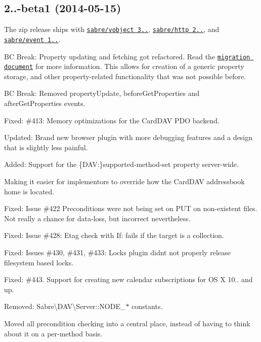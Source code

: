 \subsection*{2..-\/beta1 (2014-\/05-\/15) }


\begin{DoxyItemize}
\item The zip release ships with \href{http://sabre.io/vobject/}{\tt sabre/vobject 3..}, \href{http://sabre.io/http/}{\tt sabre/http 2..}, and \href{http://sabre.io/event/}{\tt sabre/event 1..}.
\item BC Break\+: Property updating and fetching got refactored. Read the \href{http://sabre.io/dav/upgrade/1.8-to-2.0/}{\tt migration document} for more information. This allows for creation of a generic property storage, and other property-\/related functionality that was not possible before.
\item BC Break\+: Removed {\ttfamily property\+Update}, {\ttfamily before\+Get\+Properties} and {\ttfamily after\+Get\+Properties} events.
\item Fixed\+: \#413\+: Memory optimizations for the Card\+D\+AV P\+DO backend.
\item Updated\+: Brand new browser plugin with more debugging features and a design that is slightly less painful.
\item Added\+: Support for the {\ttfamily \{D\+AV\+:\}supported-\/method-\/set} property server-\/wide.
\item Making it easier for implementors to override how the Card\+D\+AV addressbook home is located.
\item Fixed\+: Issue \#422 Preconditions were not being set on P\+UT on non-\/existent files. Not really a chance for data-\/loss, but incorrect nevertheless.
\item Fixed\+: Issue \#428\+: Etag check with {\ttfamily If\+:} fails if the target is a collection.
\item Fixed\+: Issues \#430, \#431, \#433\+: Locks plugin didn\textquotesingle{}t not properly release filesystem based locks.
\item Fixed\+: \#443. Support for creating new calendar subscriptions for OS X 10.. and up.
\item Removed\+: {\ttfamily Sabre\textbackslash{}D\+AV\textbackslash{}Server\+::\+N\+O\+D\+E\+\_\+$\ast$} constants.
\item Moved all precondition checking into a central place, instead of having to think about it on a per-\/method basis.

\end{DoxyItemize}
